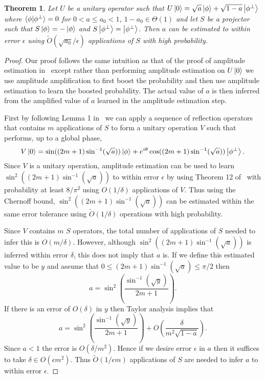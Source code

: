 \documentclass[aps,amsmath,onecolumn,amssymb]{revtex4}
\newtheorem{theorem}{Theorem}
\begin{document}
\begin{theorem}
Let $U$ be a unitary operator such that $U\left|0\right\rangle=\sqrt{a}\left|\phi\right\rangle + \sqrt{1-a}\left|\phi^\perp\right\rangle$ where $\langle\phi|\phi^\perp\rangle=0$ for $0<a\le a_0<1$, $1-a_0\in \Theta(1)$ and let $S$ be a projector such that $S\left|\phi\right\rangle=-\left|\phi\right\rangle$ and $S\left|\phi^\perp\right\rangle=\left|\phi^\perp\right\rangle$.  Then $a$ can be estimated to within error $\epsilon$ using $\tilde{O}(\sqrt{a_0}/\epsilon)$ applications of $S$ with high probability.\label{thm:priorAmpEst}
\end{theorem}
\begin{proof}
Our proof follows the same intuition as that of the proof of amplitude estimation in~\cite{BHM+02} except rather than performing amplitude estimation on $U\left|0\right\rangle$ we use amplitude amplification to first boost the probability and then use amplitude estimation to learn the boosted probability.  The actual value of $a$ is then inferred from the amplified value of $a$ learned in the amplitude estimation step.

First by following Lemma 1 in~\cite{BHM+02} we can apply a sequence of reflection operators that contains $m$ applications of $S$ to form a unitary operation $V$ such that performs, up to a global phase,
\begin{equation}
V\left|0\right\rangle = \sin((2m+1)\sin^{-1}(\sqrt{a}))\left|\phi\right\rangle + e^{i\theta}\cos((2m+1)\sin^{-1}(\sqrt{a}))\left|\phi^\perp\right\rangle.
\end{equation}
Since $V$ is a unitary operation, amplitude estimation can be used to learn $\sin^2((2m+1)\sin^{-1}(\sqrt{a}))$ to within error $\epsilon$ by using Theorem 12 of~\cite{BHM+02} with probability at least $8/\pi^2$ using $O(1/\delta)$ applications of $V$.  Thus using the Chernoff bound, $\sin^2((2m+1)\sin^{-1}(\sqrt{a}))$ can be estimated within the same error tolerance using $\tilde{O}(1/\delta)$ operations with high probability.

Since $V$ contains $m$ $S$ operators, the total number of applications of $S$ needed to infer this is $O(m/\delta)$.  However, although $\sin^2((2m+1)\sin^{-1}(\sqrt{a}))$ is inferred within error $\delta$, this does not imply that $a$ is.  If we define this estimated value to be $y$ and assume that $0\le (2m+1)\sin^{-1}(\sqrt{a}) \le \pi/2$ then
\begin{equation}
a = \sin^2\left(\frac{\sin^{-1}(\sqrt{y})}{2m+1}\right).\label{eq:aeq}
\end{equation}
If there is an error of $O(\delta)$ in $y$ then Taylor analysis implies that
\begin{equation}
a=\sin^2\left(\frac{\sin^{-1}(\sqrt{y})}{2m+1}\right) + O\left(\frac{\delta}{m^2\sqrt{1-a}} \right).
\end{equation}
Since $a<1$ the error is $O(\delta/m^2)$.  Hence if we desire error $\epsilon$ in $a$ then it suffices to take $\delta\in O(\epsilon m^2)$.  Thus $\tilde O(1/\epsilon m)$ applications of $S$ are needed to infer $a$ to within error $\epsilon$.


\end{proof}
\end{document}
